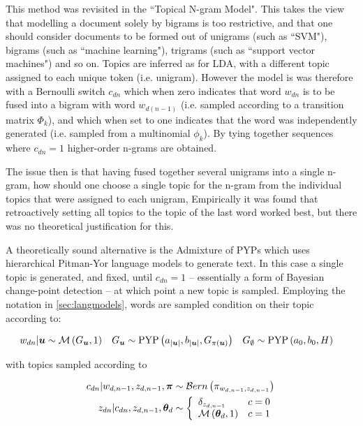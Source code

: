 This method was revisited in the ``Topical N-gram Model"\cite{Wang2007}. This takes the view that modelling a document solely by bigrams is too restrictive, and that one should consider documents to be formed out of unigrams (such as ``SVM"), bigrams (such as ``machine learning"), trigrams (such as ``support vector machines") and so on. Topics are inferred as for LDA, with a different topic assigned to each unique token (i.e. unigram). However the model is was therefore with a Bernoulli switch $c_{dn}$ which when zero indicates that word $w_{dn}$ is to be fused into a bigram with word $w_{d(n-1)}$ (i.e. sampled according to a transition matrix $\Phi_k$), and which when set to one indicates that the word was independently generated (i.e. sampled from a multinomial $\phi_k$). By tying together sequences where $c_{dn}=1$ higher-order n-grams are obtained.

The issue then is that having fused together several unigrams into a single n-gram, how should one choose a single topic for the n-gram from the individual topics that were assigned to each unigram, Empirically it was found that retroactively setting all topics to the topic of the last word worked best, but there was no theoretical justification for this. 

A theoretically sound alternative is the Admixture of PYPs \cite{Lindsey2012} which uses hierarchical Pitman-Yor language models to generate text. In this case a single topic is generated, and fixed, until $c_{dn}=1$ -- essentially a form of Bayesian change-point detection -- at which point a new topic is sampled. Employing the notation in \ref{sec:langmodels}, words are sampled condition on their topic according to:

\begin{align}
w_{dn} | \bm u &\sim \mathcal{M} \left( {G_{\bm u}},{1} \right) &
G_{\bm u} &\sim \text{PYP}\left( a_{|\bm u|}, b_{|\bm u|}, G_{\pi(\bm u)} \right) &
G_{\emptyset} &\sim \text{PYP}\left( a_{0}, b_{0}, H \right)
\end{align}

with topics sampled according to

\begin{align}
c_{dn} | w_{d,n-1}, z_{d,n-1}, \bm \pi &\sim \mathcal{B}ern \left(\pi_{ w_{d,n-1}, z_{d,n-1}}\right) \\
z_{dn} | c_{dn}, z_{d,n-1}, { \bm \theta_d } & \sim \left\{ \begin{array}{lr}
     \delta_{z_{d,n - 1}} & c = 0 \\
     \mathcal{M} \left( {{ \bm \theta_d }},{1} \right) & c = 1
 \end{array}\right.
\end{align}

